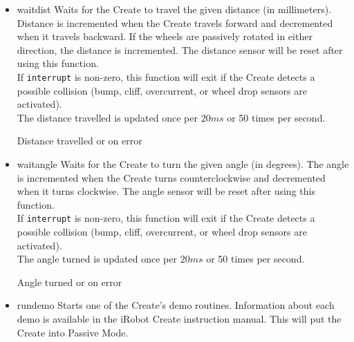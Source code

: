 \documentclass {article}
\begin{document}
\begin {itemize}
\item {}
  {waitdist} Waits for the Create to travel the given distance (in
  millimeters).  Distance is incremented when the Create travels
  forward and decremented when it travels backward.  If the wheels are
  passively rotated in either direction, the distance is incremented.
  The
  distance sensor will be reset after using this function. \\
  If {\tt interrupt} is non-zero, this function will exit if the
  Create detects a possible
  collision (bump, cliff, overcurrent, or wheel drop sensors are activated). \\
  The distance travelled is updated once per $20ms$ or 50 times per second. \\
  \ret Distance travelled or \fail on error

\item {}
  {waitangle} Waits for the Create to turn the given angle (in
  degrees).  The angle is incremented when the Create turns
  counterclockwise and decremented when it turns clockwise.  The angle
  sensor will be reset after using this function.  \\
  If {\tt interrupt} is non-zero, this function will exit if the
  Create detects a possible
  collision (bump, cliff, overcurrent, or wheel drop sensors are activated). \\
  The angle turned is updated once per $20ms$ or 50 times per second. \\
  \ret Angle turned or \fail on error
        
\item {} {rundemo} Starts one of the
  Create's demo routines.  Information about each demo is available in
  the
  iRobot Create instruction manual.  This will put the Create into Passive Mode. \\
  \retnorm


\end{itemize}
\end{document}
